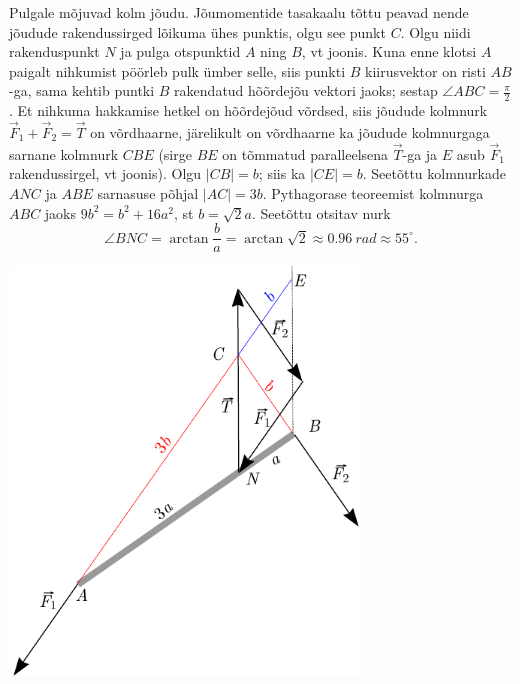 {\ifSolution
Pulgale mõjuvad kolm jõudu. Jõumomentide tasakaalu tõttu peavad nende jõudude rakendussirged lõikuma ühes punktis, olgu see punkt $C$. Olgu niidi rakenduspunkt $N$ ja pulga otspunktid $A$ ning $B$, vt joonis. Kuna enne klotsi $A$ paigalt nihkumist pöörleb pulk ümber selle, siis punkti $B$ kiirusvektor on risti $AB$-ga, sama kehtib puntki $B$ rakendatud hõõrdejõu vektori jaoks; sestap $\angle ABC=\frac{\pi}{2}$. Et nihkuma hakkamise hetkel on hõõrdejõud võrdsed, siis jõudude kolmnurk $\vec F_1+\vec F_2=\vec T$ on võrdhaarne, järelikult on võrdhaarne ka jõudude kolmnurgaga sarnane kolmnurk $CBE$ (sirge $BE$ on tõmmatud paralleelsena $\vec T$-ga ja $E$ asub $\vec F_1$ rakendussirgel, vt joonis).
Olgu $|CB|=b$; siis ka $|CE|=b$. Seetõttu kolmnurkade $ANC$ ja $ABE$ sarnasuse põhjal $|AC|=3b$. Pythagorase
teoreemist kolmnurga $ABC$ jaoks $9b^2=b^2+16a^2$, st $b=\sqrt 2a$. Seetõttu otsitav nurk 
\[
\angle BNC=\arctan \frac ba =\arctan \sqrt 2\approx\SI{0.96}{rad}\approx 55^\circ.
\]
\begin{center}
\includegraphics[width=0.7\textwidth]{2015-v3g-09-pulk_lah}
\end{center}
\fi


}
